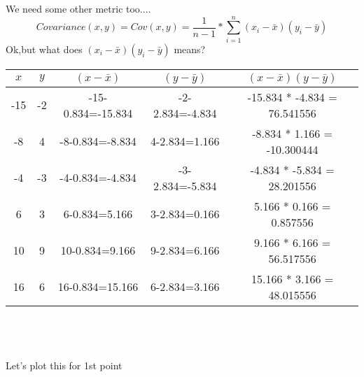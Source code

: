 \documentclass{article}
\begin{document}
We need some other metric too....\\
\pagebreak
$$
  Covariance(x,y)=Cov(x,y)=\frac{1}{n-1}*\sum_{i=1}^{n}(x_i-\bar{x})(y_i-\bar{y})
$$
Ok,but what does $(x_i-\bar{x})(y_i-\bar{y})$ means?\\
\begin{tabular}{|c|c|c|c|c|}
  \hline
  {$x$} & {$y$} & {$(x-\bar{x})$}   & {$(y-\bar{y})$} & {$(x-\bar{x})(y-\bar{y})$}   \\ \hline
  -15   & -2    & -15-0.834=-15.834 & -2-2.834=-4.834 & -15.834 * -4.834 = 76.541556 \\ \hline
  -8    & 4     & -8-0.834=-8.834   & 4-2.834=1.166   & -8.834 * 1.166 = -10.300444  \\ \hline
  -4    & -3    & -4-0.834=-4.834   & -3-2.834=-5.834 & -4.834  * -5.834 = 28.201556 \\ \hline
  6     & 3     & 6-0.834=5.166     & 3-2.834=0.166   & 5.166 * 0.166 = 0.857556     \\ \hline
  10    & 9     & 10-0.834=9.166    & 9-2.834=6.166   & 9.166 * 6.166 = 56.517556    \\ \hline
  16    & 6     & 16-0.834=15.166   & 6-2.834=3.166   & 15.166 * 3.166 = 48.015556   \\ \hline
\end{tabular}\\\\\\
Let's plot this for 1st point\\\\
\\\\
\end{document}
